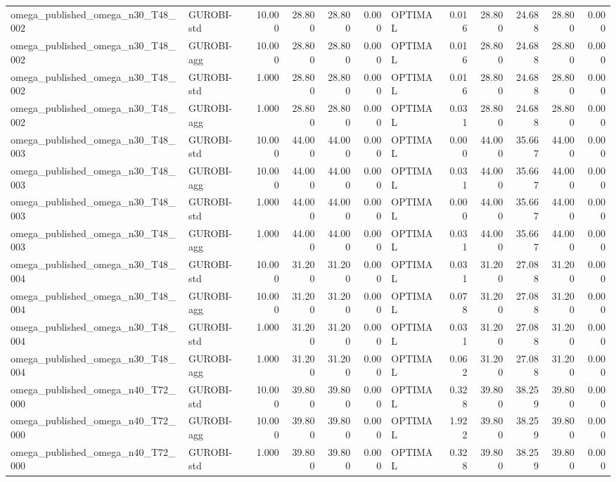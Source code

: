 \begin{table}[htbp]
\begin{tabular}{llrrrrlrrrrr}
omega\_published\_omega\_n30\_T48\_002 & GUROBI-std & 10.000 & 28.800 & 28.800 & 0.000 & OPTIMAL & 0.016 & 28.800 & 24.688 & 28.800 & 0.000 \\
omega\_published\_omega\_n30\_T48\_002 & GUROBI-agg & 10.000 & 28.800 & 28.800 & 0.000 & OPTIMAL & 0.016 & 28.800 & 24.688 & 28.800 & 0.000 \\
omega\_published\_omega\_n30\_T48\_002 & GUROBI-std & 1.000 & 28.800 & 28.800 & 0.000 & OPTIMAL & 0.016 & 28.800 & 24.688 & 28.800 & 0.000 \\
omega\_published\_omega\_n30\_T48\_002 & GUROBI-agg & 1.000 & 28.800 & 28.800 & 0.000 & OPTIMAL & 0.031 & 28.800 & 24.688 & 28.800 & 0.000 \\
omega\_published\_omega\_n30\_T48\_003 & GUROBI-std & 10.000 & 44.000 & 44.000 & 0.000 & OPTIMAL & 0.000 & 44.000 & 35.667 & 44.000 & 0.000 \\
omega\_published\_omega\_n30\_T48\_003 & GUROBI-agg & 10.000 & 44.000 & 44.000 & 0.000 & OPTIMAL & 0.031 & 44.000 & 35.667 & 44.000 & 0.000 \\
omega\_published\_omega\_n30\_T48\_003 & GUROBI-std & 1.000 & 44.000 & 44.000 & 0.000 & OPTIMAL & 0.000 & 44.000 & 35.667 & 44.000 & 0.000 \\
omega\_published\_omega\_n30\_T48\_003 & GUROBI-agg & 1.000 & 44.000 & 44.000 & 0.000 & OPTIMAL & 0.031 & 44.000 & 35.667 & 44.000 & 0.000 \\
omega\_published\_omega\_n30\_T48\_004 & GUROBI-std & 10.000 & 31.200 & 31.200 & 0.000 & OPTIMAL & 0.031 & 31.200 & 27.088 & 31.200 & 0.000 \\
omega\_published\_omega\_n30\_T48\_004 & GUROBI-agg & 10.000 & 31.200 & 31.200 & 0.000 & OPTIMAL & 0.078 & 31.200 & 27.088 & 31.200 & 0.000 \\
omega\_published\_omega\_n30\_T48\_004 & GUROBI-std & 1.000 & 31.200 & 31.200 & 0.000 & OPTIMAL & 0.031 & 31.200 & 27.088 & 31.200 & 0.000 \\
omega\_published\_omega\_n30\_T48\_004 & GUROBI-agg & 1.000 & 31.200 & 31.200 & 0.000 & OPTIMAL & 0.062 & 31.200 & 27.088 & 31.200 & 0.000 \\
omega\_published\_omega\_n40\_T72\_000 & GUROBI-std & 10.000 & 39.800 & 39.800 & 0.000 & OPTIMAL & 0.328 & 39.800 & 38.259 & 39.800 & 0.000 \\
omega\_published\_omega\_n40\_T72\_000 & GUROBI-agg & 10.000 & 39.800 & 39.800 & 0.000 & OPTIMAL & 1.922 & 39.800 & 38.259 & 39.800 & 0.000 \\
omega\_published\_omega\_n40\_T72\_000 & GUROBI-std & 1.000 & 39.800 & 39.800 & 0.000 & OPTIMAL & 0.328 & 39.800 & 38.259 & 39.800 & 0.000 \\

\end{tabular}
\end{table}
